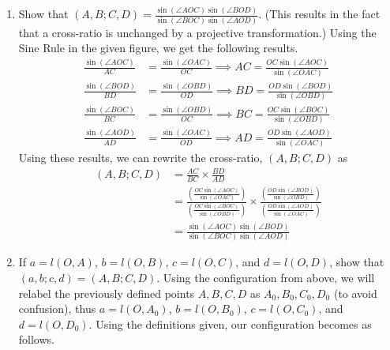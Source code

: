 \documentclass[a4paper,11pt]{article}
\newcommand{\ds}{\displaystyle}
\begin{document}
{{\begin{enumerate}[leftmargin=*]
	\begin{enumerate}
	\item Show that ${(A, B; C, D) = \frac{\sin(\angle{AOC}) \sin(\angle{BOD})}{\sin(\angle{BOC}) \sin(\angle{AOD})}}$. (This results in the fact that a cross-ratio is unchanged by a projective transformation.)
		\bigbreak
		Using the Sine Rule in the given figure, we get the following results.
		\begin{align*}
			\frac{\sin(\angle{AOC})}{AC} & = \frac{\sin(\angle{OAC})}{OC} \implies AC = \frac{OC\sin(\angle{AOC})}{\sin(\angle{OAC})}\\
			\frac{\sin(\angle{BOD})}{BD} & = \frac{\sin(\angle{OBD})}{OD} \implies BD = \frac{OD\sin(\angle{BOD})}{\sin(\angle{OBD})}\\
			\frac{\sin(\angle{BOC})}{BC} & = \frac{\sin(\angle{OBD})}{OC} \implies BC = \frac{OC\sin(\angle{BOC})}{\sin(\angle{OBD})}\\
			\frac{\sin(\angle{AOD})}{AD} & = \frac{\sin(\angle{OAC})}{OD} \implies AD = \frac{OD\sin(\angle{AOD})}{\sin(\angle{OAC})}
		\end{align*}
		Using these results, we can rewrite the cross-ratio, $\ds{(A,B;C,D)}$ as
		\begin{align*}
			(A,B;C,D) & = \frac{AC}{BC}\times\frac{BD}{AD}\\
					  & = \frac{\left(\frac{OC\sin(\angle{AOC})}{\sin(\angle{OAC})}\right)}{\left(\frac{OC\sin(\angle{BOC})}{\sin(\angle{OBD})}\right)}\times\frac{\left(\frac{OD\sin(\angle{BOD})}{\sin(\angle{OBD})}\right)}{\left(\frac{OD\sin(\angle{AOD})}{\sin(\angle{OAC})}\right)}\\
					  & = \frac{\sin(\angle{AOC}) \sin(\angle{BOD})}{\sin(\angle{BOC}) \sin(\angle{AOD})}
		\end{align*}
		\bigbreak
	\item If $\ds{a = l(O, A)}$, $\ds{b = l(O, B)}$, $\ds{c = l(O, C)}$, and $\ds{d = l(O, D)}$, show that $\ds{(a, b; c, d) = (A, B; C, D)}$. Using the configuration from above, we will relabel the previously defined points $\ds{A,B,C,D}$ as $\ds{A_0,B_0,C_0,D_0}$ (to avoid confusion), thus $\ds{a = l(O, A_0)}$, $\ds{b = l(O, B_0)}$, $\ds{c = l(O, C_0)}$, and $\ds{d = l(O, D_0)}$. Using the definitions given, our configuration becomes as follows.

	\begin{center}
\end{center}
\end{enumerate}
\end{enumerate}}}
\end{document}
